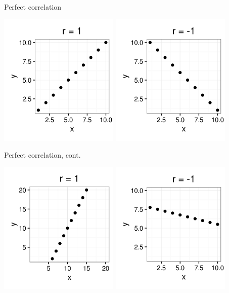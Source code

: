 \documentclass[xcolor=table, aspectratio=169, bigger]{beamer}
\begin{document}
\begin{frame}{Perfect correlation}

{\centering
\includegraphics[width=2.25in]{../images/ch10_cor_pos1}
\includegraphics[width=2.25in]{../images/ch10_cor_neg1}
\par}
\end{frame}

\begin{frame}{Perfect correlation, cont.}

{\centering
\includegraphics[width=2.25in]{../images/ch10_cor_pos2}
\includegraphics[width=2.25in]{../images/ch10_cor_neg2}
\par}
\end{frame}
\end{document}
